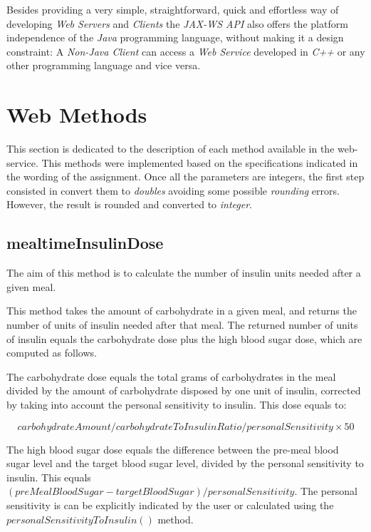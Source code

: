 Besides providing a very simple, straightforward, quick and effortless way of developing \emph{Web Servers} and \emph{Clients} the \emph{JAX-WS API} also offers the platform independence of the \emph{Java} programming language, without making it a design constraint: A \emph{Non-Java Client} can access a \emph{Web Service} developed in \emph{C++} or any other programming language and vice versa.

\section{Web Methods}

    This section is dedicated to the description of each method available in the web-service. This methods were implemented based on the specifications indicated in the wording of the assignment. Once all the parameters are integers, the first step consisted in convert them to \emph{doubles} avoiding some possible \emph{rounding} errors. However, the result is rounded and converted to \emph{integer}.

\subsection{mealtimeInsulinDose}

    The aim of this method is to calculate the number of insulin units needed after a given meal.

    This method takes the amount of carbohydrate in a given meal, and returns
the number of units of insulin needed after that meal. The returned
number of units of insulin equals the carbohydrate dose plus the high
blood sugar dose, which are computed as follows.
    
    The carbohydrate dose equals the total grams of carbohydrates in the meal
divided by the amount of carbohydrate disposed by one unit of insulin,
corrected by taking into account the personal sensitivity to insulin.
This dose equals to:

$$carbohydrateAmount / carbohydrateToInsulinRatio / personalSensitivity \times 50$$

    The high blood sugar dose equals the difference between the pre-meal
blood sugar level and the target blood sugar level, divided by the
personal sensitivity to insulin. This equals $(preMealBloodSugar -
targetBloodSugar) / personalSensitivity$. The personal sensitivity
is can be explicitly indicated by the user or calculated using the $personalSensitivityToInsulin()$ method.

